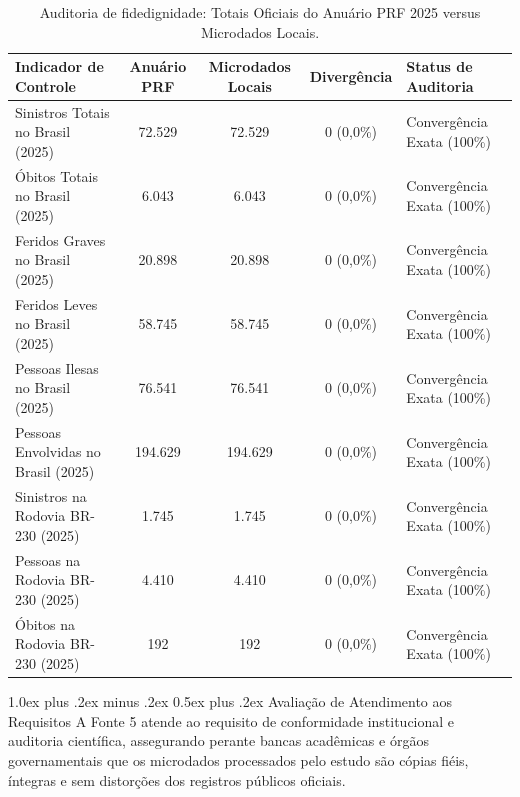 \documentclass[11pt,a4paper]{article}
\makeatletter
\renewcommand\subsubsection{
\@startsection{subsubsection}{3}{0pt}%
{1.0ex plus .2ex minus .2ex}%
{0.5ex plus .2ex}%
{\normalfont\normalsize\bfseries}
}
\makeatother
\begin{document}
\begin{table}[H]
\centering
\small
\renewcommand{\arraystretch}{1.2}
\caption{Auditoria de fidedignidade: Totais Oficiais do Anuário PRF 2025 versus Microdados Locais.}
\label{tab:desc_anuario}
\begin{tabularx}{\textwidth}{|p{5.4cm}|c|c|c|X|}
\hline
\textbf{Indicador de Controle} & \textbf{Anuário PRF} & \textbf{Microdados Locais} & \textbf{Divergência} & \textbf{Status de Auditoria} \\
\hline
Sinistros Totais no Brasil (2025) & 72.529 & 72.529 & 0 (0,0\%) & Convergência Exata (100\%) \\
\hline
Óbitos Totais no Brasil (2025) & 6.043 & 6.043 & 0 (0,0\%) & Convergência Exata (100\%) \\
\hline
Feridos Graves no Brasil (2025) & 20.898 & 20.898 & 0 (0,0\%) & Convergência Exata (100\%) \\
\hline
Feridos Leves no Brasil (2025) & 58.745 & 58.745 & 0 (0,0\%) & Convergência Exata (100\%) \\
\hline
Pessoas Ilesas no Brasil (2025) & 76.541 & 76.541 & 0 (0,0\%) & Convergência Exata (100\%) \\
\hline
Pessoas Envolvidas no Brasil (2025) & 194.629 & 194.629 & 0 (0,0\%) & Convergência Exata (100\%) \\
\hline
Sinistros na Rodovia BR-230 (2025) & 1.745 & 1.745 & 0 (0,0\%) & Convergência Exata (100\%) \\
\hline
Pessoas na Rodovia BR-230 (2025) & 4.410 & 4.410 & 0 (0,0\%) & Convergência Exata (100\%) \\
\hline
Óbitos na Rodovia BR-230 (2025) & 192 & 192 & 0 (0,0\%) & Convergência Exata (100\%) \\
\hline
\end{tabularx}
\end{table}

\subsubsection{Avaliação de Atendimento aos Requisitos}
A Fonte 5 atende ao requisito de conformidade institucional e auditoria científica, assegurando perante bancas acadêmicas e órgãos governamentais que os microdados processados pelo estudo são cópias fiéis, íntegras e sem distorções dos registros públicos oficiais.

\end{document}
